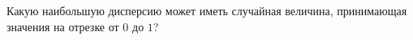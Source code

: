 \documentclass{article}
\begin{document}
Какую наибольшую дисперсию может иметь случайная величина, принимающая
значения на отрезке от $0$ до $1$?
\end{document}
